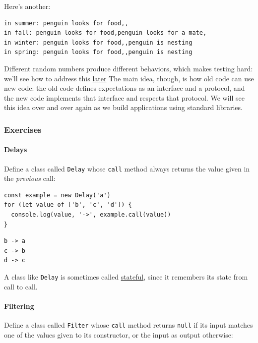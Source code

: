 Here's another:

\begin{verbatim}
in summer: penguin looks for food,,
in fall: penguin looks for food,penguin looks for a mate,
in winter: penguin looks for food,,penguin is nesting
in spring: penguin looks for food,,penguin is nesting
\end{verbatim}

Different random numbers produce different behaviors, which makes
testing hard: we'll see how to address this
\protect\hyperlink{s:testing}{later} The main idea, though, is how old
code can use new code: the old code defines expectations as an interface
and a protocol, and the new code implements that interface and respects
that protocol. We will see this idea over and over again as we build
applications using standard libraries.

\subsubsection{Exercises}\label{s:oop-exercises}

\paragraph{Delays}\label{delays}

Define a class called \texttt{Delay} whose \texttt{call} method always
returns the value given in the \emph{previous} call:

\begin{verbatim}
const example = new Delay('a')
for (let value of ['b', 'c', 'd']) {
  console.log(value, '->', example.call(value))
}
\end{verbatim}

\begin{verbatim}
b -> a
c -> b
d -> c
\end{verbatim}

A class like \texttt{Delay} is sometimes called
\protect\hyperlink{g:stateful}{stateful}, since it remembers its state
from call to call.

\paragraph{Filtering}\label{filtering}

Define a class called \texttt{Filter} whose \texttt{call} method returns
\texttt{null} if its input matches one of the values given to its
constructor, or the input as output otherwise:

